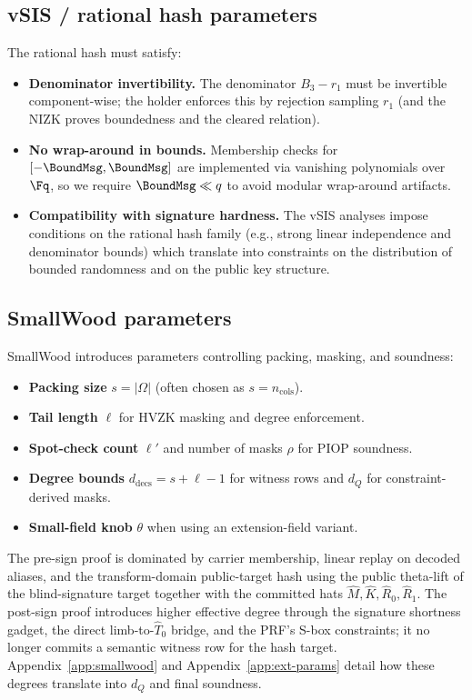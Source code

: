 \subsection{vSIS / rational hash parameters}
The rational hash must satisfy:
\begin{itemize}
  \item \textbf{Denominator invertibility.} The denominator \(B_3-r_1\) must be invertible component-wise; the holder
  enforces this by rejection sampling \(r_1\) (and the NIZK proves boundedness and the cleared relation).
  \item \textbf{No wrap-around in bounds.} Membership checks for \([-\BoundMsg,\BoundMsg]\) are implemented via vanishing
  polynomials over \(\Fq\), so we require \(\BoundMsg \ll q\) to avoid modular wrap-around artifacts.
  \item \textbf{Compatibility with signature hardness.} The vSIS analyses \cite{EPRINT:DKLW25,PKC:DKLW25} impose
  conditions on the rational hash family (e.g., strong linear independence and denominator bounds) which translate into
  constraints on the distribution of bounded randomness and on the public key structure.
\end{itemize}

\subsection{SmallWood parameters}
SmallWood introduces parameters controlling packing, masking, and soundness:
\begin{itemize}[leftmargin=1.25em]
  \item \textbf{Packing size} \(s=|\Omega|\) (often chosen as \(s=n_{\mathrm{cols}}\)).
  \item \textbf{Tail length} \(\ell\) for HVZK masking and degree enforcement.
  \item \textbf{Spot-check count} \(\ell'\) and number of masks \(\rho\) for PIOP soundness.
  \item \textbf{Degree bounds} \(d_{\mathrm{decs}}=s+\ell-1\) for witness rows and \(d_Q\) for constraint-derived masks.
  \item \textbf{Small-field knob} \(\theta\) when using an extension-field variant.
\end{itemize}
The pre-sign proof is dominated by carrier membership, linear replay on decoded
aliases, and the transform-domain public-target hash using the public
theta-lift of the blind-signature target together with the committed hats
\(\widehat M,\widehat K,\widehat R_0,\widehat R_1\).
The post-sign proof introduces higher effective degree through the signature
shortness gadget, the direct limb-to-\(\widehat T_0\) bridge, and the PRF's
S-box constraints; it no longer commits a semantic witness row for the hash
target.
Appendix~\ref{app:smallwood} and Appendix~\ref{app:ext-params} detail how
these degrees translate into \(d_Q\) and final soundness.

